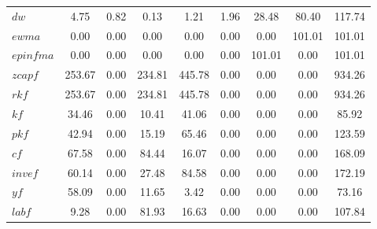 \begin{center}
\begin{longtable}{lcccccccc}
$dw       $	 & 	                4.75	 & 	                0.82	 & 	                0.13	 & 	                1.21	 & 	                1.96	 & 	               28.48	 & 	               80.40	 & 	              117.74 \\ 
$ewma     $	 & 	                0.00	 & 	                0.00	 & 	                0.00	 & 	                0.00	 & 	                0.00	 & 	                0.00	 & 	              101.01	 & 	              101.01 \\ 
$epinfma  $	 & 	                0.00	 & 	                0.00	 & 	                0.00	 & 	                0.00	 & 	                0.00	 & 	              101.01	 & 	                0.00	 & 	              101.01 \\ 
$zcapf    $	 & 	              253.67	 & 	                0.00	 & 	              234.81	 & 	              445.78	 & 	                0.00	 & 	                0.00	 & 	                0.00	 & 	              934.26 \\ 
$rkf      $	 & 	              253.67	 & 	                0.00	 & 	              234.81	 & 	              445.78	 & 	                0.00	 & 	                0.00	 & 	                0.00	 & 	              934.26 \\ 
$kf       $	 & 	               34.46	 & 	                0.00	 & 	               10.41	 & 	               41.06	 & 	                0.00	 & 	                0.00	 & 	                0.00	 & 	               85.92 \\ 
$pkf      $	 & 	               42.94	 & 	                0.00	 & 	               15.19	 & 	               65.46	 & 	                0.00	 & 	                0.00	 & 	                0.00	 & 	              123.59 \\ 
$cf       $	 & 	               67.58	 & 	                0.00	 & 	               84.44	 & 	               16.07	 & 	                0.00	 & 	                0.00	 & 	                0.00	 & 	              168.09 \\ 
$invef    $	 & 	               60.14	 & 	                0.00	 & 	               27.48	 & 	               84.58	 & 	                0.00	 & 	                0.00	 & 	                0.00	 & 	              172.19 \\ 
$yf       $	 & 	               58.09	 & 	                0.00	 & 	               11.65	 & 	                3.42	 & 	                0.00	 & 	                0.00	 & 	                0.00	 & 	               73.16 \\ 
$labf     $	 & 	                9.28	 & 	                0.00	 & 	               81.93	 & 	               16.63	 & 	                0.00	 & 	                0.00	 & 	                0.00	 & 	              107.84 \\ 

\end{longtable}
\end{center}
